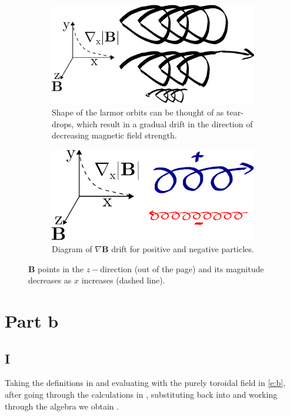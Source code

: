 \documentclass[10pt,a4paper]{article}
\begin{document}
	\begin{figure}[h!]
		\centering
		\begin{subfigure}[b]{0.6\textwidth}
			\centering
			\includegraphics[width=\linewidth]{larmor.eps}
			\caption{Shape of the larmor orbits can be thought of as tear-drops, which result in a gradual drift in the direction of decreasing magnetic field strength.}
			\label{f:larmor}
		\end{subfigure}
		
		\begin{subfigure}[b]{0.7\textwidth}
			\centering
			\includegraphics[width=\linewidth]{parta.eps}
			\caption{Diagram of $\nabla \bm{B}$ drift for positive and negative particles.}
			\label{f:gradb}
		\end{subfigure}
		\caption{$\bm{B}$ points in the $z-$direction (out of the page) and its magnitude decreases as $x$ increases (dashed line).}
		\label{f:gradbexp}
	\end{figure}
	
	\section{Part b}
	\subsection{I}
	Taking the definitions in  and evaluating with the purely toroidal field in \cref{e:b}, after going through the calculations in , substituting back into  and working through the algebra we obtain . 
	
\end{document}
